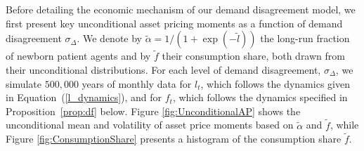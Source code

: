 \documentclass[preprint,11pt,authoryear]{elsarticle}
\theoremstyle{plain}
\begin{document}
Before detailing the economic mechanism of our demand disagreement model, we first present key unconditional asset pricing moments as a function of demand disagreement $\sigma_{\Delta}$. We denote by $\tilde{\alpha}  = 1/(1+\exp(-\tilde{l}))$ the long-run fraction of newborn patient agents and by $\tilde{f}$ their consumption share, both drawn from their unconditional distributions. For each level of demand disagreement, $\sigma_{\Delta}$, we simulate $500,000$ years of monthly data for $l_t$, which follows the dynamics given in Equation~(\ref{l_dynamics}), and for $f_t$, which follows the dynamics specified in Proposition~\ref{prop:df} below. Figure \ref{fig:UnconditionalAP} shows the unconditional mean and volatility of asset price moments based on $\tilde{\alpha}$ and $\tilde{f}$, while Figure \ref{fig:ConsumptionShare} presents a histogram of the consumption share $\tilde{f}$.  
%
\end{document}
